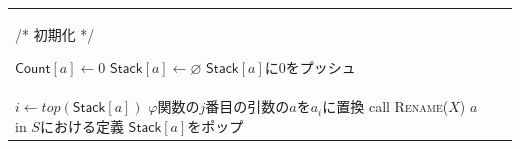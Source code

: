 \documentclass[dvipdfmx,a4j]{jbook}
\begin{document}
\begin{algorithm}[t]
    \caption{SSAへの変換}\label{alg:RenameForSSA}
    \begin{tabularx}{\textwidth}{m{}m{}}
        \begin{minipage}{.4\textwidth}
            /* 初期化 */
            \begin{algorithmic}
                \ForAll{$a\ \in Var$}
                \State $\mathsf{Count}[a]\leftarrow 0$
                \State $\mathsf{Stack}[a]\leftarrow \varnothing$
                \State $\mathsf{Stack}[a]$に$0$をプッシュ
                \EndFor
            \end{algorithmic}
        \end{minipage}
         &
        \begin{minipage}{.6\textwidth}
            \begin{algorithmic}[1]
                \Procedure{Rename}{$n$}
                \ForAll{$S$\ in ブロック$n$}
                \If{$S$が$\varphi$関数でないとき}
                \ForAll{$x$ in $S$で参照される変数}
                \State $i\leftarrow top(\mathsf{Stack}[x])$
                \State $S$の$x$の参照を$x_i$で置き換える
                \EndFor
                \EndIf
                \ForAll{$S$の左辺で定義される変数$a$}
                \State $\mathsf{Count}[a]\leftarrow\mathsf{Count}[a]+1$
                \State $i\leftarrow\mathsf{Count}[a]$
                \State $\mathsf{Stack}[a]$に$i$をpush
                \State $S$の左辺の$a$を$a_i$で置き換える
                \EndFor
                \EndFor
                \ForAll{$Y$ in ブロック$n$の後続頂点}
                \State $n$は$Y$の$j$番目の先行頂点
                \ForAll $Y$に含まれる$\varphi$関数
                \State $\varphi$関数の$j$番目の引数が$a$のとき\\
                \hspace*{7em}$i\leftarrow top(\mathsf{Stack}[a])$
                \State $\varphi$関数の$j$番目の引数の$a$を$a_i$に置換
                \EndFor
                \EndFor
                \ForAll{$X$ in 支配木における$n$の子頂点}
                \State call \textsc{Rename}($X$)
                \EndFor
                \ForAll{ブロック$n$の$S$}
                \ForAll $a$ in $S$における定義
                \State $\mathsf{Stack}[a]$をポップ
                \EndFor
                \EndFor
                \EndProcedure
            \end{algorithmic}
        \end{minipage}
    \end{tabularx}
\end{algorithm}
\end{document}
